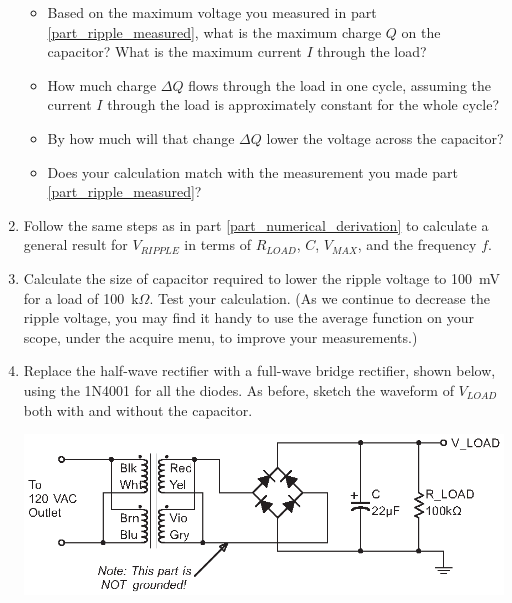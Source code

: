 \begin{enumerate}[wide]
\begin{itemize}
\item Based on the maximum voltage you measured in part \ref{part_ripple_measured}, what is the maximum charge $Q$ on the capacitor?  What is the maximum current $I$ through the load?  \label{part_numerical_derivation}

\item How much charge $\Delta Q$ flows through the load in one cycle, assuming the current $I$ through the load is approximately constant for the whole cycle?  

\item By how much will that change $\Delta Q$ lower the voltage across the capacitor?  

\item Does your calculation match with the measurement you made part \ref{part_ripple_measured}?  
\end{itemize}

\item Follow the same steps as in part \ref{part_numerical_derivation} to calculate a general result for $V_{RIPPLE}$ in terms of $R_{LOAD}$, $C$,  $V_{MAX}$, and the frequency $f$. \label{part_symbolic_derivation}

\item Calculate the size of capacitor required to lower the ripple voltage to 100~mV for a load of 100~k$\Omega$.  Test your calculation.  (As we continue to decrease the ripple voltage, you may find it handy to use the average function on your scope, under the acquire menu, to improve your measurements.)

\item Replace the half-wave rectifier with a full-wave bridge rectifier, shown below, using the 1N4001 for all the diodes.  As before, sketch the waveform of $V_{LOAD}$ both with and without the capacitor.
\begin{center}
\includegraphics{power_supply/full_wave_bridge_rectifier.eps}
\end{center}


\end{enumerate}
